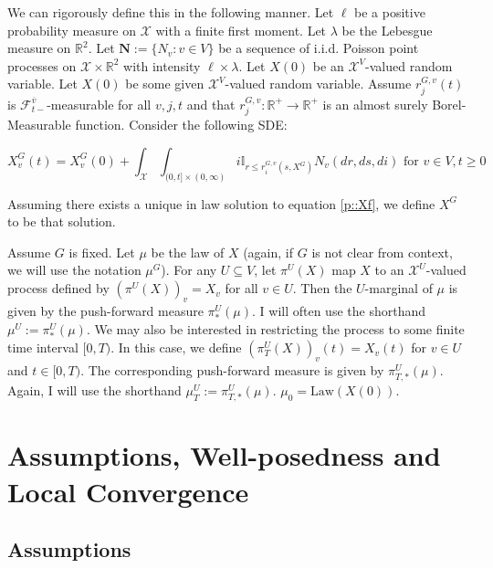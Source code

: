 \documentclass[12pt]{article}
\newcommand{\mb}{\mathbb}
\newcommand{\mc}{\mathcal}
\newcommand{\ra}{\rightarrow}
\newcommand{\ov}{\overline}
\newcommand{\te}{\text}
\newcommand{\ind}{\hspace{24pt}}
\newcommand{\defeq}{:=}								%
\newcommand{\sta}{\mc{X}}							%
\newcommand{\cl}[1]{\ov{#1}}						%
\newcommand{\Xf}{X}									%
\newcommand{\poiss}{N}								%
\newcommand{\leb}{\lambda}							%
\newcommand{\Sm}{\ell}								%
\newcommand{\rate}{r}								%
\newcommand{\F}{\mc{F}}								%
\newcommand{\m}{\mu}								%
\newcommand{\proj}{\pi}								%
\newcommand{\poisses}{\mathbf{N}}					%
\newcommand{\poissv}[1]{_{#1}}						%
\newcommand{\vind}[1]{_{#1}}						%
\newcommand{\tme}[1]{(#1)}							%
\newcommand{\gind}[1]{^{#1}}						%
\newcommand{\vpara}[1]{^{#1}}						%
\newcommand{\stpara}[1]{_{#1}}						%
\newcommand{\tpara}[1]{_{#1}}						%
\newcommand{\gvpara}[2]{^{#1,#2}}					%
\newcommand{\psf}{_*}								%
\newcommand{\tparapsf}[1]{_{#1,*}}					%
\newcommand{\tmepro}[2]{(#1,#2)}					%
\newcommand{\law}{\te{Law}}							%
\begin{document}
\ind We can rigorously define this in the following manner. Let \(\Sm\) be a positive probability measure on \(\sta\) with a finite first moment. Let \(\leb\) be the Lebesgue measure on \(\mb{R}^2\). Let \(\poisses \defeq \{\poiss\poissv{v}:v \in V\}\) be a sequence of i.i.d. Poisson point processes on \(\sta\times \mb{R}^2\) with intensity \(\Sm\times \leb\). Let \(\Xf\tme{0}\) be an \(\sta^V\)-valued random variable. Let \(\Xf\tme{0}\) be some given \(\sta^V\)-valued random variable. Assume \(\rate\gvpara{G}{v}\stpara{j}(t)\) is \(\F\vpara{\cl{v}}\tpara{t-}\)-measurable for all \(v,j,t\) and that \(\rate\gvpara{G}{v}\stpara{j}:\mb{R}^+ \ra\mb{R}^+\) is an almost surely Borel-Measurable function. Consider the following SDE:

\begin{equation}
\Xf\gind{G}\vind{v}\tme{t} = \Xf\gind{G}\vind{v}\tme{0} + \int_{\sta}\int_{(0,t]\times (0,\infty)} i\mb{I}_{r \leq \rate\gvpara{G}{v}\stpara{i}\tmepro{s}{\Xf\gind{G}}} \poiss\poissv{v}\left(dr,ds,di\right) \te{ for } v\in V, t \geq 0
\label{p::Xf}
\end{equation}

Assuming there exists a unique in law solution to equation \eqref{p::Xf}, we define \(\Xf\gind{G}\) to be that solution. 

\ind Assume \(G\) is fixed. Let \(\m\) be the law of \(\Xf\) (again, if \(G\) is not clear from context, we will use the notation \(\m\gind{G}\)). For any \(U \subseteq V\), let \(\proj\vpara{U}(\Xf)\) map \(\Xf\) to an \(\sta^U\)-valued process defined by \((\proj\vpara{U}(\Xf))\vind{v} = \Xf\vind{v}\) for all \(v\in U\). Then the \(U\)-marginal of \(\m\) is given by the push-forward measure \(\proj\vpara{U}\psf(\m)\). I will often use the shorthand \(\m\vpara{U} \defeq \proj\psf\vpara{U}(\m)\). We may also be interested in restricting the process to some finite time interval \([0,T)\). In this case, we define \((\proj\vpara{U}\tpara{T}(\Xf))\vind{v}\tme{t} = \Xf\vind{v}\tme{t}\) for \(v \in U\) and \(t \in [0,T)\). The corresponding push-forward measure is given by \(\proj\vpara{U}\tparapsf{T}(\m)\). Again, I will use the shorthand \(\m\vpara{U}\tpara{T} \defeq \proj\vpara{U}\tparapsf{T}(\m)\). \(\m\tpara{0} = \law(\Xf\tme{0})\).

\section{Assumptions, Well-posedness and Local Convergence}
\label{awl}
\subsection{Assumptions}
\end{document}
